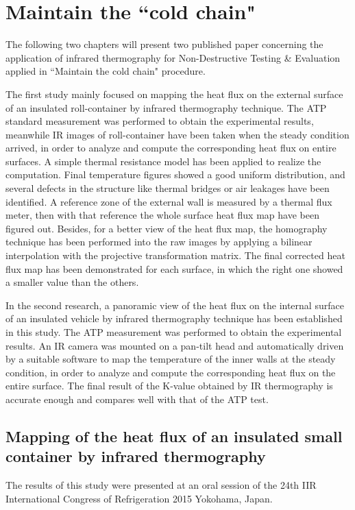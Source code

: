 \part{Maintain the ``cold chain"}     %
The following two chapters will present two published paper concerning the application of infrared thermography for Non-Destructive Testing \& Evaluation applied in ``Maintain the cold chain" procedure.

The first study mainly focused on mapping the heat flux on the external surface of an insulated roll-container by infrared thermography technique. The ATP standard measurement was performed to obtain the experimental results, meanwhile IR images of roll-container have been taken when the steady condition arrived, in order to analyze and compute the corresponding heat flux on entire surfaces. A simple thermal resistance model has been applied to realize the computation. Final temperature figures showed a good uniform distribution, and several defects in the structure like thermal bridges or air leakages have been identified. A reference zone of the external wall is measured by a thermal flux meter, then with that reference the whole surface heat flux map have been figured out. Besides, for a better view of the heat flux map, the homography technique has been performed into the raw images by applying a bilinear interpolation with the projective transformation matrix. The final corrected heat flux map has been demonstrated for each surface, in which the right one showed a smaller value than the others. 

In the second research, a panoramic view of the heat flux on the internal surface of an insulated vehicle by infrared thermography technique has been established in this study. The ATP measurement was performed to obtain the experimental results.  An IR camera was mounted on a pan-tilt head and automatically driven by a suitable software to map the temperature of the inner walls at the steady condition, in order to analyze and compute the corresponding heat flux on the entire surface.  The final result of the K-value obtained by IR thermography is accurate enough and compares well with that of the ATP test.

\chapter{Mapping of the heat flux of an insulated small container by infrared thermography}
The results of this study were presented at an oral session of the 24th IIR International Congress of Refrigeration 2015 Yokohama, Japan.

